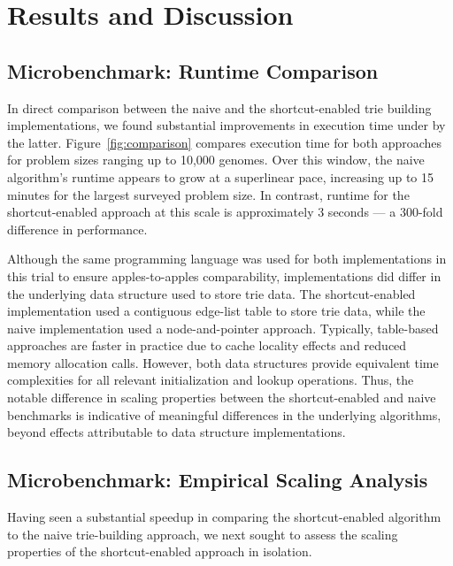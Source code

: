 \section{Results and Discussion} \label{sec:results}

\subsection{Microbenchmark: Runtime Comparison}

In direct comparison between the naive and the shortcut-enabled trie building implementations, we found substantial improvements in execution time under by the latter.
Figure~\ref{fig:comparison} compares execution time for both approaches for problem sizes ranging up to 10,000 genomes.
Over this window, the naive algorithm's runtime appears to grow at a superlinear pace, increasing up to 15 minutes for the largest surveyed problem size.
In contrast, runtime for the shortcut-enabled approach at this scale is approximately 3 seconds --- a 300-fold difference in performance.



Although the same programming language was used for both implementations in this trial to ensure apples-to-apples comparability, implementations did differ in the underlying data structure used to store trie data.
The shortcut-enabled implementation used a contiguous edge-list table to store trie data, while the naive implementation used a node-and-pointer approach.
Typically, table-based approaches are faster in practice due to cache locality effects and reduced memory allocation calls.
However, both data structures provide equivalent time complexities for all relevant initialization and lookup operations.
Thus, the notable difference in scaling properties between the shortcut-enabled and naive benchmarks is indicative of meaningful differences in the underlying algorithms, beyond effects attributable to data structure implementations.

\subsection{Microbenchmark: Empirical Scaling Analysis}



Having seen a substantial speedup in comparing the shortcut-enabled algorithm to the naive trie-building approach, we next sought to assess the scaling properties of the shortcut-enabled approach in isolation.

